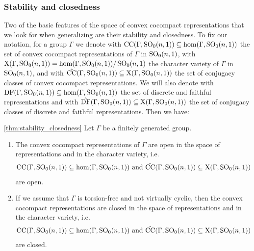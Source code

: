 \documentclass{report}
\begin{document}
\subsubsection{Stability and closedness}
Two of the basic features of the space of convex cocompact representations that we look for when generalizing are their stability and closedness.
To fix our notation, for a group $\Gamma$ we denote with $\mathrm{CC}(\Gamma, \operatorname{{\mathrm{SO}}}_0(n,1)) \subseteq \hom(\Gamma, \operatorname{{\mathrm{SO}}}_0(n,1))$ the set of convex cocompact representations of $\Gamma$ in $\operatorname{{\mathrm{SO}}}_0(n,1)$, with $\mathrm{X}(\Gamma, \operatorname{{\mathrm{SO}}}_0(n,1)) = \hom(\Gamma, \operatorname{{\mathrm{SO}}}_0(n,1))/\operatorname{{\mathrm{SO}}}_0(n,1)$ the character variety of $\Gamma$ in $\operatorname{{\mathrm{SO}}}_0(n,1)$, and with $\hat{\mathrm{CC}}(\Gamma, \operatorname{{\mathrm{SO}}}_0(n,1)) \subseteq \mathrm{X}(\Gamma, \operatorname{{\mathrm{SO}}}_0(n,1))$ the set of conjugacy classes of convex cocompact representations.
We will also denote with $\mathrm{DF}(\Gamma, \operatorname{{\mathrm{SO}}}_0(n,1)) \subseteq \hom(\Gamma, \operatorname{{\mathrm{SO}}}_0(n,1))$ the set of discrete and faithful representations and with $\hat{\mathrm{DF}}(\Gamma, \operatorname{{\mathrm{SO}}}_0(n,1)) \subseteq \mathrm{X}(\Gamma, \operatorname{{\mathrm{SO}}}_0(n,1))$ the set of conjugacy classes of discrete and faithful representations.
Then we have:
\begin{theorem}\cref{thm:stability_closedness}
    Let $\Gamma$ be a finitely generated group.
    \begin{enumerate}[label=(\roman*)]
        \item The convex cocompact representations of $\Gamma$ are open in the space of representations and in the character variety, i.e.\ 
        \[
        \mathrm{CC}(\Gamma, \operatorname{{\mathrm{SO}}}_0(n,1)) \subseteq \hom(\Gamma, \operatorname{{\mathrm{SO}}}_0(n,1)) \text{ and } \hat{\mathrm{CC}}(\Gamma, \operatorname{{\mathrm{SO}}}_0(n,1)) \subseteq \mathrm{X}(\Gamma, \operatorname{{\mathrm{SO}}}_0(n,1))
        \]
        are open.
        \item If we assume that $\Gamma$ is torsion-free and not virtually cyclic, then the convex cocompact representations are closed in the space of representations and in the character variety, i.e.\
        \[
        \mathrm{CC}(\Gamma, \operatorname{{\mathrm{SO}}}_0(n,1)) \subseteq \hom(\Gamma, \operatorname{{\mathrm{SO}}}_0(n,1)) \text{ and } \hat{\mathrm{CC}}(\Gamma, \operatorname{{\mathrm{SO}}}_0(n,1)) \subseteq \mathrm{X}(\Gamma, \operatorname{{\mathrm{SO}}}_0(n,1))
        \]
        are closed.
    \end{enumerate}
\end{theorem}
\end{document}
